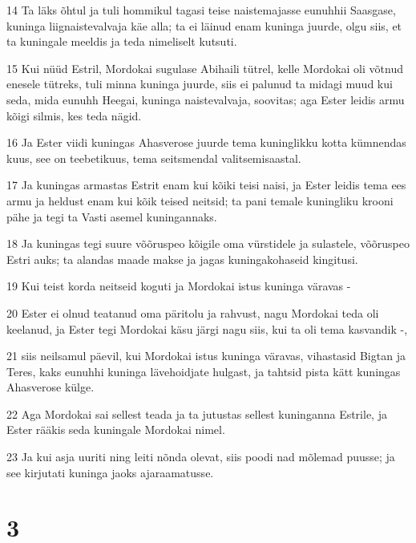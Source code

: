 \par 14 Ta läks õhtul ja tuli hommikul tagasi teise naistemajasse eunuhhii Saasgase, kuninga liignaistevalvaja käe alla; ta ei läinud enam kuninga juurde, olgu siis, et ta kuningale meeldis ja teda nimeliselt kutsuti.
\par 15 Kui nüüd Estril, Mordokai sugulase Abihaili tütrel, kelle Mordokai oli võtnud enesele tütreks, tuli minna kuninga juurde, siis ei palunud ta midagi muud kui seda, mida eunuhh Heegai, kuninga naistevalvaja, soovitas; aga Ester leidis armu kõigi silmis, kes teda nägid.
\par 16 Ja Ester viidi kuningas Ahasverose juurde tema kuninglikku kotta kümnendas kuus, see on teebetikuus, tema seitsmendal valitsemisaastal.
\par 17 Ja kuningas armastas Estrit enam kui kõiki teisi naisi, ja Ester leidis tema ees armu ja heldust enam kui kõik teised neitsid; ta pani temale kuningliku krooni pähe ja tegi ta Vasti asemel kuningannaks.
\par 18 Ja kuningas tegi suure võõruspeo kõigile oma vürstidele ja sulastele, võõruspeo Estri auks; ta alandas maade makse ja jagas kuningakohaseid kingitusi.
\par 19 Kui teist korda neitseid koguti ja Mordokai istus kuninga väravas -
\par 20 Ester ei olnud teatanud oma päritolu ja rahvust, nagu Mordokai teda oli keelanud, ja Ester tegi Mordokai käsu järgi nagu siis, kui ta oli tema kasvandik -,
\par 21 siis neilsamul päevil, kui Mordokai istus kuninga väravas, vihastasid Bigtan ja Teres, kaks eunuhhi kuninga lävehoidjate hulgast, ja tahtsid pista kätt kuningas Ahasverose külge.
\par 22 Aga Mordokai sai sellest teada ja ta jutustas sellest kuninganna Estrile, ja Ester rääkis seda kuningale Mordokai nimel.
\par 23 Ja kui asja uuriti ning leiti nõnda olevat, siis poodi nad mõlemad puusse; ja see kirjutati kuninga jaoks ajaraamatusse.

\chapter{3}


